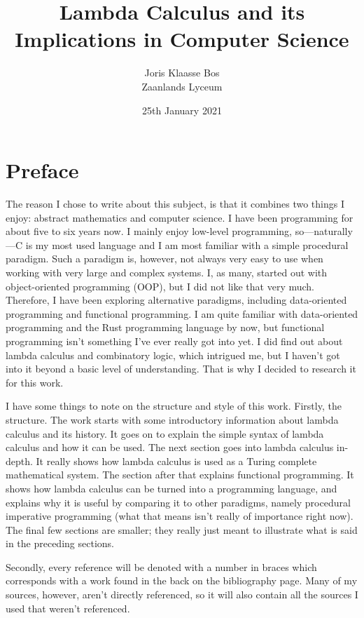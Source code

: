 \documentclass[11pt]{article}
\date{25th January 2021}
\title{Lambda Calculus and its Implications in Computer Science}
\author{Joris Klaasse Bos\\ Zaanlands Lyceum}
\begin{document}
\maketitle
\thispagestyle{empty}
\newpage

\newpage
\thispagestyle{empty}
\mbox{}
\newpage

\section*{Preface}


The reason I chose to write about this subject, is that it combines two things
I enjoy: abstract mathematics and computer science. I have been programming for
about five to six years now. I mainly enjoy low-level programming,
so---naturally---C is my most used language and I am most familiar with a
simple procedural paradigm. Such a paradigm is, however, not always very easy
to use when working with very large and complex systems. I, as many, started
out with object-oriented programming (OOP), but I did not like that very much.
Therefore, I have been exploring alternative paradigms, including data-oriented
programming and functional programming. I am quite familiar with data-oriented
programming and the Rust programming language by now, but functional
programming isn't something I've ever really got into yet. I did find out about
lambda calculus and combinatory logic, which intrigued me, but I haven’t got
into it beyond a basic level of understanding. That is why I decided to
research it for this work. 

I have some things to note on the structure and style of this work. Firstly,
the structure. The work starts with some introductory information about lambda
calculus and its history. It goes on to explain the simple syntax of lambda
calculus and how it can be used. The next section goes into lambda calculus
in-depth. It really shows how lambda calculus is used as a Turing complete
mathematical system. The section after that explains functional programming. It
shows how lambda calculus can be turned into a programming language, and
explains why it is useful by comparing it to other paradigms, namely procedural
imperative programming (what that means isn't really of importance right now).
The final few sections are smaller; they really just meant to illustrate what
is said in the preceding sections.

Secondly, every reference will be denoted with a number in braces which
corresponds with a work found in the back on the bibliography page. Many of my
sources, however, aren't directly referenced, so it will also contain all the
sources I used that weren't referenced.
\end{document}
